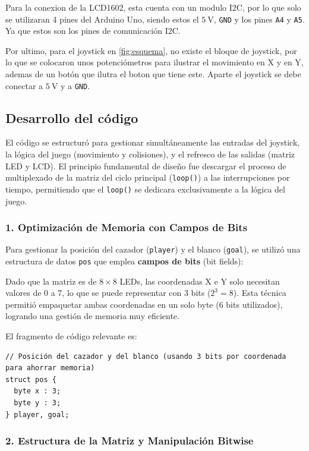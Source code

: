 Para la conexion de la LCD1602, esta cuenta con un modulo I2C, por lo que solo se utilizaran 4 pines del Arduino Uno, siendo estos el $\SI{5}{\volt}$, \texttt{GND} y los pines \texttt{A4}
y \texttt{A5}. Ya que estos son los pines de comunicación I2C. 

Por ultimo, para el joystick en \autoref{fig:esquema}, no existe el bloque de joystick, por lo que se colocaron unos potenciómetros para ilustrar el movimiento en X y en Y, ademas de un botón 
que ilutra el boton que tiene este. Aparte el joystick se debe conectar a $\SI{5}{\volt}$ y a \texttt{GND}.

\subsection{Desarrollo del código}
El código se estructuró para gestionar simultáneamente las entradas del joystick, la lógica del juego (movimiento y colisiones), y el refresco de las salidas (matriz LED y LCD). El principio fundamental de diseño fue descargar el proceso de multiplexado de la matriz del ciclo principal (\texttt{loop()}) a las interrupciones por tiempo, permitiendo que el \texttt{loop()} se dedicara exclusivamente a la lógica del juego.




\subsubsection*{1. Optimización de Memoria con Campos de Bits}

Para gestionar la posición del cazador (\texttt{player}) y el blanco (\texttt{goal}), se utilizó una estructura de datos \texttt{pos} que emplea \textbf{campos de bits} (bit fields):

Dado que la matriz es de $8\times8$ LEDs, las coordenadas X e Y solo necesitan valores de 0 a 7, lo que se puede representar con 3 bits ($2^3=8$). Esta técnica permitió empaquetar ambas coordenadas en un solo byte (6 bits utilizados), logrando una gestión de memoria muy eficiente.

El fragmento de código relevante es:

    \begin{verbatim}
// Posición del cazador y del blanco (usando 3 bits por coordenada para ahorrar memoria)
struct pos {
  byte x : 3;
  byte y : 3;
} player, goal;
    \end{verbatim}


\subsubsection*{2. Estructura de la Matriz y Manipulación Bitwise}

